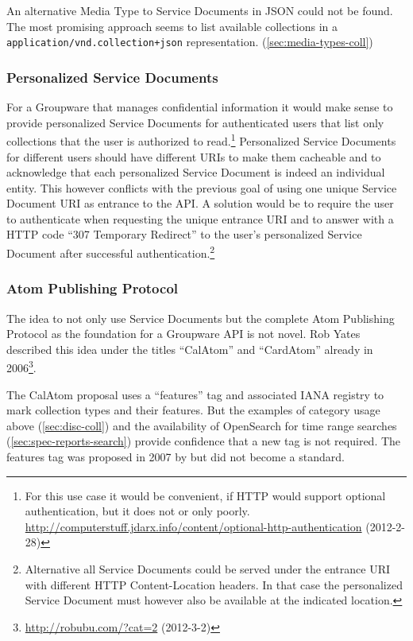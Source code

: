 \documentclass[12pt,a4paper,twoside]{scrartcl}		%
\newcommand{\citeurl}[2]{\url{#1} (#2)}
\begin{document}
An alternative Media Type to Service Documents in JSON could not be found. The
most promising approach seems to list available collections in a
\lstinline:application/vnd.collection+json: representation. (\autoref{sec:media-types-coll})

\subsubsection{Personalized Service Documents} For a Groupware that manages
confidential information it would make sense to provide personalized Service
Documents for authenticated users that list only collections that the user is
authorized to read.\footnote{For this use case it would be convenient, if HTTP
  would support optional authentication, but it does not or only
  poorly. \citeurl{http://computerstuff.jdarx.info/content/optional-http-authentication}{2012-2-28}}
Personalized Service Documents for different users should have different URIs to
make them cacheable and to acknowledge that each personalized Service Document
is indeed an individual entity. This however conflicts with the previous goal of
using one unique Service Document URI as entrance to the API. A solution would
be to require the user to authenticate when requesting the unique entrance URI
and to answer with a HTTP code ``307 Temporary Redirect'' to the user's
personalized Service Document after successful
authentication.\footnote{Alternative all Service Documents could be served under
  the entrance URI with different HTTP Content-Location
  headers\cite[sec. 14.14]{RFC2616}. In that case the personalized Service
  Document must however also be available at the indicated location.}


\subsubsection{Atom Publishing Protocol}
\label{sec:atom-publ-prot}

The idea to not only use Service Documents but the complete Atom Publishing
Protocol as the foundation for a Groupware API is not novel. Rob Yates described
this idea under the titles ``CalAtom'' and ``CardAtom'' already in
2006\footnote{\citeurl{http://robubu.com/?cat=2}{2012-3-2}}.

The CalAtom\cite{draft-yates-atompub-calatom-00.txt} proposal uses a
``features'' tag and associated IANA registry to mark collection types and their
features. But the examples of category usage above (\autoref{sec:disc-coll}) and
the availability of OpenSearch for time range searches
(\autoref{sec:spec-reports-search}) provide confidence that a new tag is not
required. The features tag was proposed in 2007 by
\cite{draft-snell-atompub-feature} but did not become a standard.
\end{document}

